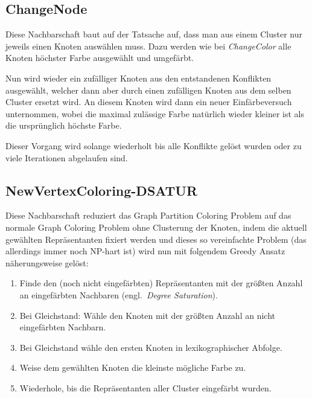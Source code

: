 \subsection{ChangeNode}
\label{sec:changenode}
Diese Nachbarschaft baut auf der Tatsache auf, dass man aus einem Cluster nur jeweils einen Knoten auswählen muss. Dazu werden wie bei \emph{ChangeColor} alle Knoten höchster Farbe ausgewählt und umgefärbt.

Nun wird wieder ein zufälliger Knoten aus den entstandenen Konflikten ausgewählt, welcher dann aber durch einen zufälligen Knoten aus dem selben Cluster ersetzt wird. An diesem Knoten wird dann ein neuer Einfärbeversuch unternommen, wobei die maximal zulässige Farbe natürlich wieder kleiner ist als die ursprünglich höchste Farbe.

Dieser Vorgang wird solange wiederholt bis alle Konflikte gelöst wurden oder zu viele Iterationen abgelaufen sind.

\subsection{NewVertexColoring-DSATUR}
Diese Nachbarschaft reduziert das Graph Partition Coloring Problem auf das normale Graph Coloring Problem ohne Clusterung der Knoten, indem die aktuell gewählten Repräsentanten fixiert werden und dieses so vereinfachte Problem (das allerdings immer noch NP-hart ist) wird nun mit folgendem Greedy Ansatz näherungsweise gelöst:

\begin{enumerate}
    \item Finde den (noch nicht eingefärbten) Repräsentanten mit der größten Anzahl an eingefärbten Nachbaren (engl.\ \textit{Degree Saturation}).
    \item Bei Gleichstand: Wähle den Knoten mit der größten Anzahl an nicht eingefärbten Nachbarn.
    \item Bei Gleichstand wähle den ersten Knoten in lexikographischer Abfolge.
    \item Weise dem gewählten Knoten die kleinste mögliche Farbe zu.
    \item Wiederhole, bis die Repräsentanten aller Cluster eingefärbt wurden.
\end{enumerate}

